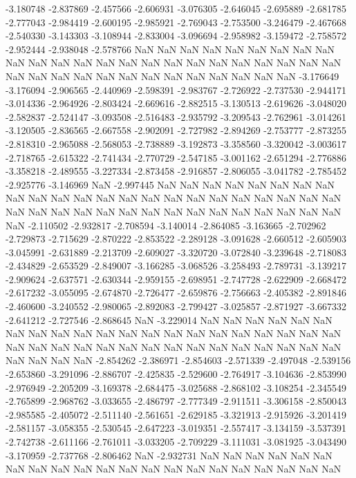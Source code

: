 -3.180748
-2.837869
-2.457566
-2.606931
-3.076305
-2.646045
-2.695889
-2.681785
-2.777043
-2.984419
-2.600195
-2.985921
-2.769043
-2.753500
-3.246479
-2.467668
-2.540330
-3.143303
-3.108944
-2.833004
-3.096694
-2.958982
-3.159472
-2.758572
-2.952444
-2.938048
-2.578766
NaN
NaN
NaN
NaN
NaN
NaN
NaN
NaN
NaN
NaN
NaN
NaN
NaN
NaN
NaN
NaN
NaN
NaN
NaN
NaN
NaN
NaN
NaN
NaN
NaN
NaN
NaN
NaN
NaN
NaN
NaN
NaN
NaN
NaN
NaN
NaN
NaN
-3.176649
-3.176094
-2.906565
-2.440969
-2.598391
-2.983767
-2.726922
-2.737530
-2.944171
-3.014336
-2.964926
-2.803424
-2.669616
-2.882515
-3.130513
-2.619626
-3.048020
-2.582837
-2.524147
-3.093508
-2.516483
-2.935792
-3.209543
-2.762961
-3.014261
-3.120505
-2.836565
-2.667558
-2.902091
-2.727982
-2.894269
-2.753777
-2.873255
-2.818310
-2.965088
-2.568053
-2.738889
-3.192873
-3.358560
-3.320042
-3.003617
-2.718765
-2.615322
-2.741434
-2.770729
-2.547185
-3.001162
-2.651294
-2.776886
-3.358218
-2.489555
-3.227334
-2.873458
-2.916857
-2.806055
-3.041782
-2.785452
-2.925776
-3.146969
NaN
-2.997445
NaN
NaN
NaN
NaN
NaN
NaN
NaN
NaN
NaN
NaN
NaN
NaN
NaN
NaN
NaN
NaN
NaN
NaN
NaN
NaN
NaN
NaN
NaN
NaN
NaN
NaN
NaN
NaN
NaN
NaN
NaN
NaN
NaN
NaN
NaN
NaN
NaN
NaN
NaN
-2.110502
-2.932817
-2.708594
-3.140014
-2.864085
-3.163665
-2.702962
-2.729873
-2.715629
-2.870222
-2.853522
-2.289128
-3.091628
-2.660512
-2.605903
-3.045991
-2.631889
-2.213709
-2.609027
-3.320720
-3.072840
-3.239648
-2.718083
-2.434829
-2.653529
-2.849007
-3.166285
-3.068526
-3.258493
-2.789731
-3.139217
-2.909624
-2.637571
-2.630344
-2.959155
-2.698951
-2.747728
-2.622909
-2.668472
-2.617232
-3.055095
-2.674870
-2.726477
-2.659876
-2.756663
-2.405382
-2.891846
-2.460600
-3.240552
-2.980065
-2.892083
-2.799427
-3.025857
-2.871927
-3.667332
-2.641212
-2.727546
-2.868645
NaN
-3.229014
NaN
NaN
NaN
NaN
NaN
NaN
NaN
NaN
NaN
NaN
NaN
NaN
NaN
NaN
NaN
NaN
NaN
NaN
NaN
NaN
NaN
NaN
NaN
NaN
NaN
NaN
NaN
NaN
NaN
NaN
NaN
NaN
NaN
NaN
NaN
NaN
NaN
NaN
NaN
NaN
-2.854262
-2.386971
-2.854603
-2.571339
-2.497048
-2.539156
-2.653860
-3.291096
-2.886707
-2.425835
-2.529600
-2.764917
-3.104636
-2.853990
-2.976949
-2.205209
-3.169378
-2.684475
-3.025688
-2.868102
-3.108254
-2.345549
-2.765899
-2.968762
-3.033655
-2.486797
-2.777349
-2.911511
-3.306158
-2.850043
-2.985585
-2.405072
-2.511140
-2.561651
-2.629185
-3.321913
-2.915926
-3.201419
-2.581157
-3.058355
-2.530545
-2.647223
-3.019351
-2.557417
-3.134159
-3.537391
-2.742738
-2.611166
-2.761011
-3.033205
-2.709229
-3.111031
-3.081925
-3.043490
-3.170959
-2.737768
-2.806462
NaN
-2.932731
NaN
NaN
NaN
NaN
NaN
NaN
NaN
NaN
NaN
NaN
NaN
NaN
NaN
NaN
NaN
NaN
NaN
NaN
NaN
NaN
NaN
